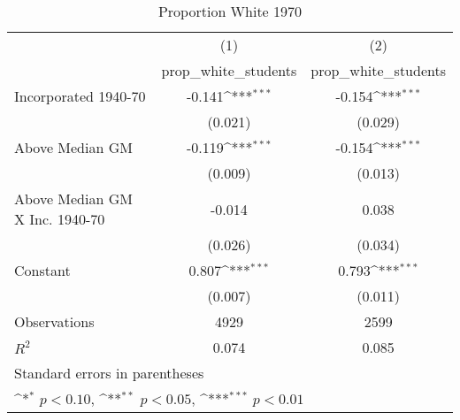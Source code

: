 \begin{table}[htbp]\centering
\def\sym#1{\ifmmode^{#1}\else\(^{#1}\)\fi}
\caption{Proportion White 1970}
\begin{tabular}{l*{2}{c}}
\hline\hline
                    &\multicolumn{1}{c}{(1)}&\multicolumn{1}{c}{(2)}\\
                    &\multicolumn{1}{c}{prop\_white\_students}&\multicolumn{1}{c}{prop\_white\_students}\\
\hline
Incorporated 1940-70&      -0.141\sym{***}&      -0.154\sym{***}\\
                    &     (0.021)         &     (0.029)         \\
[1em]
Above Median GM     &      -0.119\sym{***}&      -0.154\sym{***}\\
                    &     (0.009)         &     (0.013)         \\
[1em]
Above Median GM X Inc. 1940-70&      -0.014         &       0.038         \\
                    &     (0.026)         &     (0.034)         \\
[1em]
Constant            &       0.807\sym{***}&       0.793\sym{***}\\
                    &     (0.007)         &     (0.011)         \\
\hline
Observations        &        4929         &        2599         \\
\(R^{2}\)           &       0.074         &       0.085         \\
\hline\hline
\multicolumn{3}{l}{\footnotesize Standard errors in parentheses}\\
\multicolumn{3}{l}{\footnotesize \sym{*} \(p<0.10\), \sym{**} \(p<0.05\), \sym{***} \(p<0.01\)}\\
\end{tabular}
\end{table}
